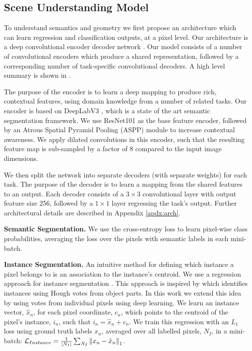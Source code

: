 \subsection{Scene Understanding Model}
\label{sec:arch}

To understand semantics and geometry we first propose an architecture which can learn regression and classification outputs, at a pixel level. Our architecture is a deep convolutional encoder decoder network \cite{badrinarayanan2017segnet}. Our model consists of a number of convolutional encoders which produce a shared representation, followed by a corresponding number of task-specific convolutional decoders. A high level summary is shown in .

The purpose of the encoder is to learn a deep mapping to produce rich, contextual features, using domain knowledge from a number of related tasks. Our encoder is based on DeepLabV3 \cite{chen2017rethinking}, which is a state of the art semantic segmentation framework. We use ResNet101 \cite{he2016deep} as the base feature encoder, followed by an Atrous Spatial Pyramid Pooling (ASPP) module \cite{chen2017rethinking} to increase contextual awareness. We apply dilated convolutions in this encoder, such that the resulting feature map is sub-sampled by a factor of 8 compared to the input image dimensions. 

We then split the network into separate decoders (with separate weights) for each task. The purpose of the decoder is to learn a mapping from the shared features to an output. Each decoder consists of a $3\times3$ convolutional layer with output feature size 256, followed by a $1\times1$ layer regressing the task's output. 
Further architectural details are described in Appendix \ref{apdx:arch}.

\textbf{Semantic Segmentation.}
We use the cross-entropy loss to learn pixel-wise class probabilities, averaging the loss over the pixels with semantic labels in each mini-batch.

\textbf{Instance Segmentation.}
An intuitive method for defining which instance a pixel belongs to is an association to the instance's centroid.
We use a regression approach for instance segmentation \cite{liang2015proposal}. This approach is inspired by \cite{leibe2008robust} which identifies instances using Hough votes from object parts. In this work we extend this idea by using votes from individual pixels using deep learning. We learn an instance vector, $\hat{x}_n$, for each pixel coordinate, $c_n$, which points to the centroid of the pixel's instance, $i_n$, such that $i_n=\hat{x}_n+c_n$. We train this regression with an $L_1$ loss using ground truth labels $x_n$, averaged over all labelled pixels, $N_I$, in a mini-batch: $\mathcal{L}_{Instance} = \frac{1}{|N_I|} \sum_{N_I} \left\lVert x_n - \hat{x}_n \right\rVert_1$.

